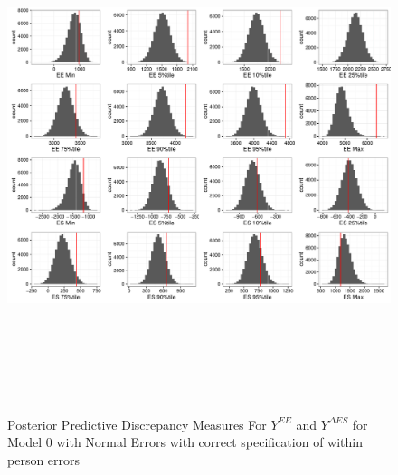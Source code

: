 \documentclass[11pt]{article}\usepackage[]{graphicx}\usepackage[]{color}
\begin{document}
\begin{figure}
 \centering
 \includegraphics[width=17cm,height=15cm]{manual_figure/wpydiag0.pdf}
 \caption{Posterior Predictive Discrepancy Measures For $Y^{EE}$ and $Y^{\Delta ES}$ for Model 0 with Normal Errors with correct specification of within person errors}
 \label{ydiag0wp}
 \end{figure}
\end{document}
